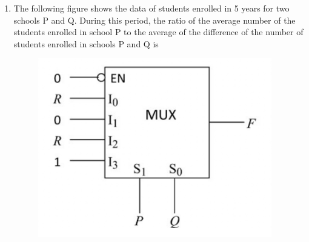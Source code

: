 \documentclass[a4paper, 11pt]{article}
\begin{document}
\begin{enumerate}
    \item The following figure shows the data of students enrolled in 5 years  for two schools P and Q. During this period, the ratio of the average number of the students enrolled in school P to the average of the difference of the number of students enrolled in schools P and Q is
    \begin{figure}[H]
        \centering
        \includegraphics[width=0.6\columnwidth]{figs/Q10.png}
        \caption*{}
        \label{fig:q10}
    \end{figure}
    \begin{enumerate}
    \end{enumerate}
    \hfill{}
\end{enumerate}
\end{document}
